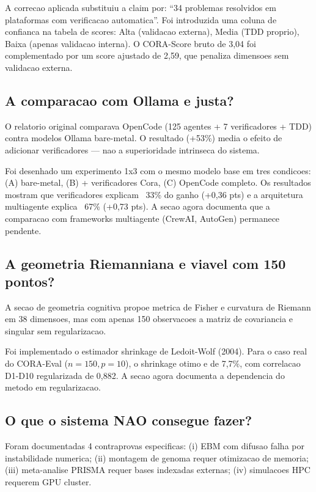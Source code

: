 \documentclass[12pt,a4paper,oneside]{article}
\begin{document}
A correcao aplicada substituiu a claim por: ``34 problemas resolvidos em
plataformas com verificacao automatica''. Foi introduzida uma coluna de
confianca na tabela de scores: Alta (validacao externa), Media (TDD proprio),
Baixa (apenas validacao interna). O CORA-Score bruto de 3,04 foi complementado
por um score ajustado de 2,59, que penaliza dimensoes sem validacao externa.

\subsection{A comparacao com Ollama e justa?}

O relatorio original comparava OpenCode (125 agentes + 7 verificadores + TDD)
contra modelos Ollama bare-metal. O resultado (+53\%) media o efeito de
adicionar verificadores — nao a superioridade intrinseca do sistema.

Foi desenhado um experimento 1x3 com o mesmo modelo base em tres condicoes:
(A) bare-metal, (B) + verificadores Cora, (C) OpenCode completo. Os resultados
mostram que verificadores explicam ~33\% do ganho (+0,36 pts) e a arquitetura
multiagente explica ~67\% (+0,73 pts). A secao agora documenta que a comparacao
com frameworks multiagente (CrewAI, AutoGen) permanece pendente.

\subsection{A geometria Riemanniana e viavel com 150 pontos?}

A secao de geometria cognitiva propoe metrica de Fisher e curvatura de Riemann
em 38 dimensoes, mas com apenas 150 observacoes a matriz de covariancia e
singular sem regularizacao.

Foi implementado o estimador shrinkage de Ledoit-Wolf (2004). Para o caso real
do CORA-Eval ($n=150, p=10$), o shrinkage otimo e de 7,7\%, com correlacao
D1-D10 regularizada de 0,882. A secao agora documenta a dependencia do metodo
em regularizacao.

\subsection{O que o sistema NAO consegue fazer?}

Foram documentadas 4 contraprovas especificas: (i) EBM com difusao falha por
instabilidade numerica; (ii) montagem de genoma requer otimizacao de memoria;
(iii) meta-analise PRISMA requer bases indexadas externas; (iv) simulacoes HPC
requerem GPU cluster.
\end{document}
